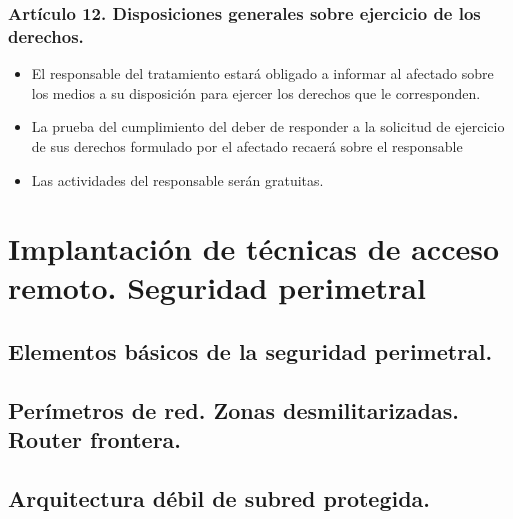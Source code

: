 \documentclass[letterpaper,10pt,spanish]{sphinxmanual}
\begin{document}
\subsection{Artículo 12. Disposiciones generales sobre ejercicio de los derechos.}
\label{\detokenize{tema_lopd/tema_lopd:articulo-12-disposiciones-generales-sobre-ejercicio-de-los-derechos}}\begin{itemize}
\item {} 
El responsable del tratamiento estará obligado a informar al afectado sobre los medios a su disposición para ejercer los derechos que le corresponden.

\item {} 
La prueba del cumplimiento del deber de responder a la solicitud de ejercicio de sus derechos formulado por el afectado recaerá sobre el responsable

\item {} 
Las actividades del responsable serán gratuitas.

\end{itemize}


\chapter{Implantación de técnicas de acceso remoto. Seguridad perimetral}
\label{\detokenize{tema_acceso_remoto/tema_acceso_remoto:implantacion-de-tecnicas-de-acceso-remoto-seguridad-perimetral}}\label{\detokenize{tema_acceso_remoto/tema_acceso_remoto::doc}}

\section{Elementos básicos de la seguridad perimetral.}
\label{\detokenize{tema_acceso_remoto/tema_acceso_remoto:elementos-basicos-de-la-seguridad-perimetral}}

\section{Perímetros de red. Zonas desmilitarizadas. Router frontera.}
\label{\detokenize{tema_acceso_remoto/tema_acceso_remoto:perimetros-de-red-zonas-desmilitarizadas-router-frontera}}

\section{Arquitectura débil de subred protegida.}
\label{\detokenize{tema_acceso_remoto/tema_acceso_remoto:arquitectura-debil-de-subred-protegida}}
\end{document}
